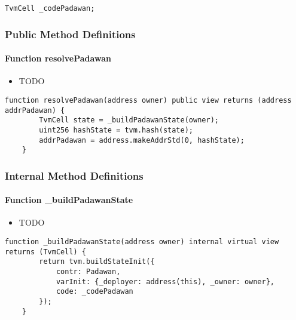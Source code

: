 \begin{lstlisting}[firstnumber=8]
    TvmCell _codePadawan;
\end{lstlisting}

\subsubsection{Public Method Definitions}


\paragraph{Function resolvePadawan}

\begin{itemize}
\item TODO
\end{itemize}

\begin{lstlisting}[firstnumber=10]
    function resolvePadawan(address owner) public view returns (address addrPadawan) {
        TvmCell state = _buildPadawanState(owner);
        uint256 hashState = tvm.hash(state);
        addrPadawan = address.makeAddrStd(0, hashState);
    }
\end{lstlisting}

\subsubsection{Internal Method Definitions}


\paragraph{Function \_{}buildPadawanState}

\begin{itemize}
\item TODO
\end{itemize}

\begin{lstlisting}[firstnumber=16]
    function _buildPadawanState(address owner) internal virtual view returns (TvmCell) {
        return tvm.buildStateInit({
            contr: Padawan,
            varInit: {_deployer: address(this), _owner: owner},
            code: _codePadawan
        });
    }
\end{lstlisting}
